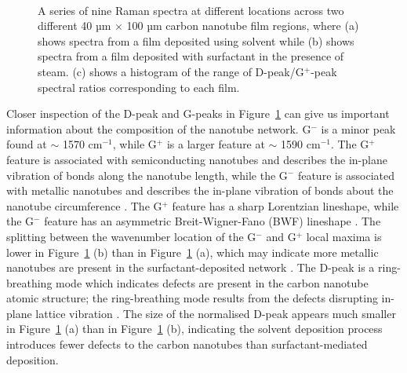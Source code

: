 \documentclass[
  a4paper,
]{scrbook}
\begin{document}
\begin{figure}
\begin{minipage}[t]{0.72\linewidth}
{{}

}

\end{minipage}%
%
\begin{minipage}[t]{0.14\linewidth}

{\centering 

~

}

\end{minipage}%

\caption[Raman spectra at different locations across two different 40 µm
\(\times\) 100 µm carbon nanotube film regions, along with a histogram
of D-peak/G\(^+\)-peak spectral ratios corresponding to each
film.]{\label{fig-pristine-raman}A series of nine Raman spectra at
different locations across two different 40 µm \(\times\) 100 µm carbon
nanotube film regions, where (a) shows spectra from a film deposited
using solvent while (b) shows spectra from a film deposited with
surfactant in the presence of steam. (c) shows a histogram of the range
of D-peak/G\(^+\)-peak spectral ratios corresponding to each film.}

\end{figure}

Closer inspection of the D-peak and G-peaks in
Figure~\ref{fig-pristine-raman} can give us important information about
the composition of the nanotube network. G\(^-\) is a minor peak found
at \(\sim\) 1570 cm\(^{-1}\), while G\(^+\) is a larger feature at
\(\sim\) 1590 cm\(^{-1}\). The G\(^+\) feature is associated with
semiconducting nanotubes and describes the in-plane vibration of bonds
along the nanotube length, while the G\(^-\) feature is associated with
metallic nanotubes and describes the in-plane vibration of bonds about
the nanotube circumference \autocite{King2014,Swiniarski2021}. The
G\(^+\) feature has a sharp Lorentzian lineshape, while the G\(^-\)
feature has an asymmetric Breit-Wigner-Fano (BWF) lineshape
\autocite{Blackburn2006,Swiniarski2021}. The splitting between the
wavenumber location of the G\(^-\) and G\(^+\) local maxima is lower in
Figure~\ref{fig-pristine-raman} (b) than in
Figure~\ref{fig-pristine-raman} (a), which may indicate more metallic
nanotubes are present in the surfactant-deposited network
\autocite{Swiniarski2021}. The D-peak is a ring-breathing mode which
indicates defects are present in the carbon nanotube atomic structure;
the ring-breathing mode results from the defects disrupting in-plane
lattice vibration
\autocite{King2014,CuentasGallegos2011,Swiniarski2021}. The size of the
normalised D-peak appears much smaller in
Figure~\ref{fig-pristine-raman} (a) than in
Figure~\ref{fig-pristine-raman} (b), indicating the solvent deposition
process introduces fewer defects to the carbon nanotubes than
surfactant-mediated deposition.
\end{document}
